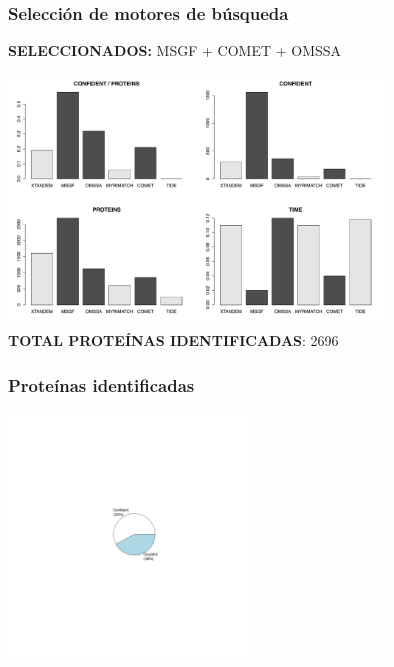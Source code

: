 \documentclass[10pt]{beamer}
\begin{document}
\begin{frame}
\frametitle{Selección de motores de búsqueda}
\begin{center}
\textbf{SELECCIONADOS:} MSGF + COMET + OMSSA 
\end{center}
\begin{center}
\includegraphics[width=10cm]{imagenes/ENGINES}\\
\textbf{TOTAL PROTEÍNAS IDENTIFICADAS}: 2696
\end{center}
\end{frame}
\begin{frame}
\frametitle{Proteínas identificadas}
\begin{center}
\includegraphics[width=6.5cm]{imagenes/Proteins}
\end{center}
\end{frame}
\end{document}
